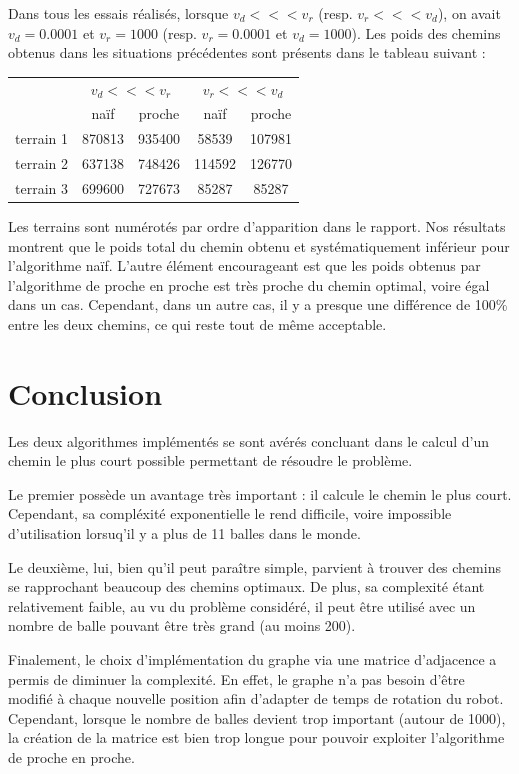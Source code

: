 \documentclass[12pt]{article}
\begin{document}
    Dans tous les essais réalisés, lorsque $v_d <<< v_r$ (resp. $v_r <<< v_d$), on avait $v_d = 0.0001$ et $v_r = 1000$ (resp. $v_r = 0.0001$ et $v_d = 1000$). Les poids des chemins obtenus dans les situations précédentes sont présents dans le tableau suivant :
    
    \medskip
    
    \begin{tabular}{c|c|c|c|c|}
      \cline{2-5}
      & \multicolumn{2}{c|}{$v_d <<< v_r$} & \multicolumn{2}{c|}{$v_r <<< v_d$} \\
      \cline{2-5}
      & naïf & proche & naïf & proche \\
      \hline
      terrain 1 & 870813 & 935400 & 58539 & 107981 \\
      \hline
      terrain 2 & 637138 & 748426 & 114592 & 126770 \\
      \hline
      terrain 3 & 699600 & 727673 & 85287 & 85287 \\
   \end{tabular}

   Les terrains sont numérotés par ordre d'apparition dans le rapport. Nos résultats montrent que le poids total du chemin obtenu et systématiquement inférieur pour l'algorithme naïf. L'autre élément encourageant est que les poids obtenus par l'algorithme de proche en proche est très proche du chemin optimal, voire égal dans un cas. Cependant, dans un autre cas, il y a presque une différence de 100\% entre les deux chemins, ce qui reste tout de même acceptable.

   \section{Conclusion}
   \label{sec:ccl}

   Les deux algorithmes implémentés se sont avérés concluant dans le calcul d'un chemin le plus court possible permettant de résoudre le problème.
   
   Le premier possède un avantage très important : il calcule le chemin le plus court. Cependant, sa compléxité exponentielle le rend difficile, voire impossible d'utilisation lorsuq'il y a plus de 11 balles dans le monde.
   
   Le deuxième, lui, bien qu'il peut paraître simple, parvient à trouver des chemins se rapprochant beaucoup des chemins optimaux. De plus, sa complexité étant relativement faible, au vu du problème considéré, il peut être utilisé avec un nombre de balle pouvant être très grand (au moins 200).

   Finalement, le choix d'implémentation du graphe via une matrice d'adjacence a permis de diminuer la complexité. En effet, le graphe n'a pas besoin d'être modifié à chaque nouvelle position afin d'adapter de temps de rotation du robot. Cependant, lorsque le nombre de balles devient trop important (autour de 1000), la création de la matrice est bien trop longue pour pouvoir exploiter l'algorithme de proche en proche.
\end{document}
